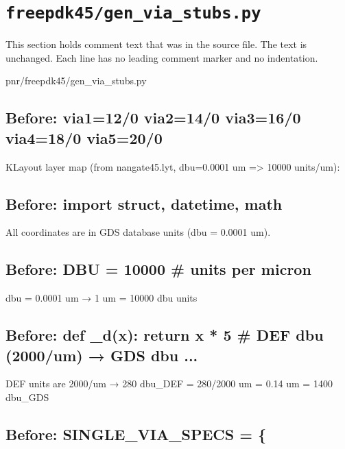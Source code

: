 \section{\texttt{freepdk45/gen\_via\_stubs.py}}\label{tm:pd:freepdk45-gen-via-stubs-py}

This section holds comment text that was in the source file. The text is unchanged. Each line has no leading comment marker and no indentation.

\begin{relocated}{pnr/freepdk45/gen_via_stubs.py}

\subsection*{Before: via1=12/0  via2=14/0  via3=16/0  via4=18/0  via5=20/0}

\begin{textblock}
KLayout layer map (from nangate45.lyt, dbu=0.0001 um => 10000 units/um):
\end{textblock}

\subsection*{Before: import struct, datetime, math}

\begin{textblock}
All coordinates are in GDS database units (dbu = 0.0001 um).
\end{textblock}

\subsection*{Before: DBU = 10000  \# units per micron}

\begin{textblock}
dbu = 0.0001 um → 1 um = 10000 dbu units
\end{textblock}

\subsection*{Before: def \_d(x): return x * 5   \# DEF dbu (2000/um) → GDS dbu ...}

\begin{textblock}
DEF units are 2000/um → 280 dbu_DEF = 280/2000 um = 0.14 um = 1400 dbu_GDS
\end{textblock}

\subsection*{Before: SINGLE\_VIA\_SPECS = \{}


\end{relocated}

